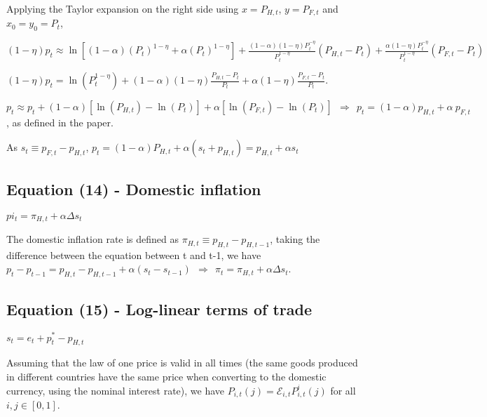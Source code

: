 \documentclass[
]{article}
\begin{document}
Applying the Taylor expansion on the right side using \(x = P_{H,t}\),
\(y = P_{F,t}\) and \(x_0 = y_0 = P_t\),

\(\displaystyle (1-\eta)p_t \approx \ln \left[ (1-\alpha)(P_t)^{1-\eta} + \alpha(P_t)^{1-\eta} \right]+ \frac{(1-\alpha)(1-\eta)P_t^{-\eta}}{P_t^{1-\eta}}(P_{H,t}-P_t) + \frac{\alpha(1-\eta)P_t^{-\eta}}{P_t^{1-\eta}}(P_{F,t}-P_t)\)

\(\displaystyle (1-\eta)p_t = \ln(P_t^{1-\eta}) + (1-\alpha)(1-\eta)\frac{P_{H,t}-P_t}{P_t} + \alpha(1-\eta)\frac{P_{F,t}-P_t}{P_t}\).

\(p_t \approx p_t + (1-\alpha)[\ln(P_{H,t})-\ln(P_t)] + \alpha[\ln(P_{F,t})-\ln(P_t)] \ \ \Rightarrow \ \  p_t = (1-\alpha)p_{H,t}+\alpha \ p_{F,t}\),
as defined in the paper.

As \(s_t \equiv p_{F,t}-p_{H,t}\),
\(p_t=(1-\alpha)P_{H,t}+\alpha (s_t+p_{H,t}) = p_{H,t} + \alpha s_t\)

\vspace{12pt}

\hypertarget{equation-14---domestic-inflation}{%
\subsection{Equation (14) - Domestic
inflation}\label{equation-14---domestic-inflation}}

\(pi_t = \pi_{H,t}+\alpha \Delta s_t\)

\vspace{8pt}

The domestic inflation rate is defined as
\(\displaystyle \pi_{H,t} \equiv p_{H,t}-p_{H,t-1}\), taking the
difference between the equation between t and t-1, we have
\(p_t-p_{t-1}=p_{H,t}-p_{H,t-1}+\alpha(s_t-s_{t-1}) \ \ \Rightarrow \ \ \pi_t = \pi_{H,t}+\alpha \Delta s_t\).

\vspace{12pt}

\hypertarget{equation-15---log-linear-terms-of-trade}{%
\subsection{Equation (15) - Log-linear terms of
trade}\label{equation-15---log-linear-terms-of-trade}}

\(s_t =e_t + p_t^*-p_{H,t}\)

\vspace{8pt}

Assuming that the law of one price is valid in all times (the same goods
produced in different countries have the same price when converting to
the domestic currency, using the nominal interest rate), we have
\(P_{i,t}(j) = \mathcal{E}_{i,t}P_{i,t}^i(j)\) for all
\(i, j \in [0,1]\).
\end{document}
